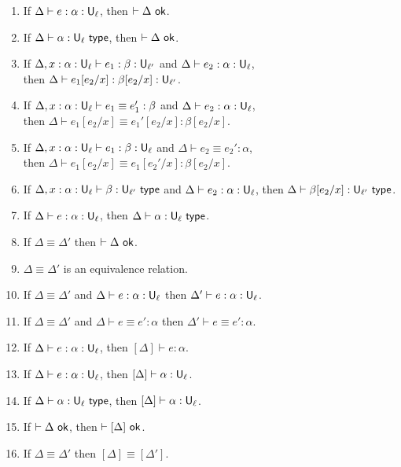 \begin{lemma}
\begin{enumerate}
\item If $\Delta\vdash e:\alpha:\U_\ell$, then $\vdash \Delta\ok$.
\item If $\Delta\vdash \alpha:\U_\ell\type$, then $\vdash \Delta\ok$.
\item If $\Delta,x:\alpha:\U_\ell\vdash e_1:\beta:\U_{\ell'}$ and $\Delta\vdash e_2:\alpha:\U_\ell$,\\
then $\Delta\vdash e_1[e_2/x]:\beta[e_2/x]:\U_{\ell'}$.
\item If $\Delta,x:\alpha:\U_\ell\vdash e_1\equiv e_1':\beta$ and $\Delta\vdash e_2:\alpha:\U_\ell$,\\
then $\Delta\vdash e_1[e_2/x]\equiv e_1'[e_2/x]:\beta[e_2/x]$.
\item If $\Delta,x:\alpha:\U_\ell\vdash e_1:\beta:\U_\ell$ and $\Delta\vdash e_2\equiv e_2':\alpha$,\\
then $\Delta\vdash e_1[e_2/x]\equiv e_1[e_2'/x]:\beta[e_2/x]$.
\item If $\Delta,x:\alpha:\U_\ell\vdash \beta:\U_{\ell'}\type$ and $\Delta\vdash e_2:\alpha:\U_\ell$, then $\Delta\vdash \beta[e_2/x]:\U_{\ell'}\type$.
\item If $\Delta\vdash e:\alpha:\U_\ell$, then $\Delta\vdash \alpha:\U_\ell\type$.
\item If $\Delta\equiv\Delta'$ then $\vdash\Delta\ok$.
\item $\Delta\equiv\Delta'$ is an equivalence relation.
\item If $\Delta\equiv\Delta'$ and $\Delta\vdash e:\alpha:\U_\ell$ then $\Delta'\vdash e:\alpha:\U_\ell$.
\item If $\Delta\equiv\Delta'$ and $\Delta\vdash e\equiv e':\alpha$ then $\Delta'\vdash e\equiv e':\alpha$.
\item If $\Delta\vdash e:\alpha:\U_\ell$, then $[\Delta]\vdash e:\alpha$.
\item If $\Delta\vdash e:\alpha:\U_\ell$, then $[\Delta]\vdash \alpha:\U_\ell$.
\item If $\Delta\vdash \alpha:\U_\ell\type$, then $[\Delta]\vdash \alpha:\U_\ell$.
\item If $\vdash\Delta\ok$, then $\vdash[\Delta]\ok$.
\item If $\Delta\equiv\Delta'$ then $[\Delta]\equiv[\Delta']$.
\end{enumerate}
\end{lemma}
